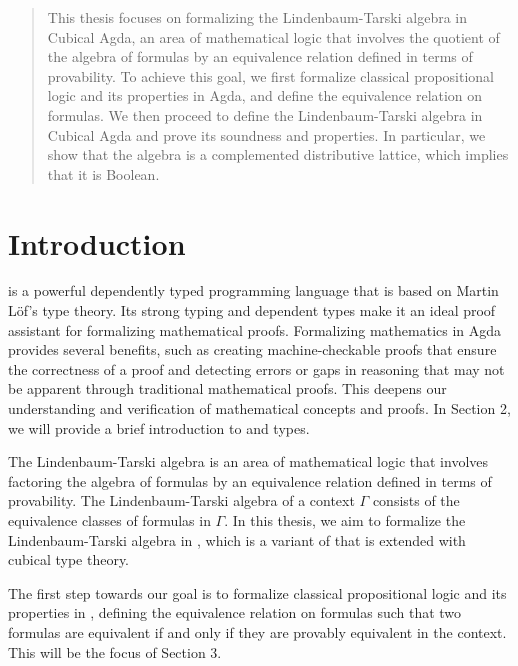 \documentclass[titlepage]{article}
\begin{document}

\begin{abstract}
    This thesis focuses on formalizing the Lindenbaum-Tarski algebra in Cubical Agda, an area of mathematical logic that involves the quotient of the algebra of formulas by an equivalence relation defined in terms of provability. To achieve this goal, we first formalize classical propositional logic and its properties in Agda, and define the equivalence relation on formulas. We then proceed to define the Lindenbaum-Tarski algebra in Cubical Agda and prove its soundness and properties. In particular, we show that the algebra is a complemented distributive lattice, which implies that it is Boolean.
\end{abstract}

\tableofcontents
\thispagestyle{empty}
\newpage
\setcounter{page}{1}



\section{Introduction}

\Agda is a powerful dependently typed programming language that is based on Martin Löf's type theory. Its strong typing and dependent types make it an ideal proof assistant for formalizing mathematical proofs.\cite{AgdaDoc} Formalizing mathematics in Agda provides several benefits, such as creating machine-checkable proofs that ensure the correctness of a proof and detecting errors or gaps in reasoning that may not be apparent through traditional mathematical proofs. This deepens our understanding and verification of mathematical concepts and proofs. In Section 2, we will provide a brief introduction to \Agda and types.

The Lindenbaum-Tarski algebra is an area of mathematical logic that involves factoring the algebra of formulas by an equivalence relation defined in terms of provability.\cite{wikipedia} The Lindenbaum-Tarski algebra of a context $\Gamma$ consists of the equivalence classes of formulas in $\Gamma$. In this thesis, we aim to formalize the Lindenbaum-Tarski algebra in \CubicalAgda, which is a variant of \Agda that is extended with cubical type theory.

The first step towards our goal is to formalize classical propositional logic and its properties in \Agda, defining the equivalence relation on formulas such that two formulas are equivalent if and only if they are provably equivalent in the context. This will be the focus of Section 3.
\end{document}

